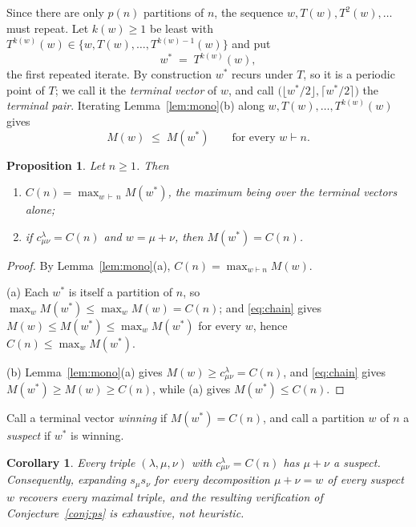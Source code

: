 \documentclass[11pt]{article}
\newtheorem{proposition}[theorem]{Proposition}
\newtheorem{corollary}[theorem]{Corollary}
\theoremstyle{remark}
\newcommand{\lam}{\lambda}
\begin{document}
Since there are only $p(n)$ partitions of $n$, the sequence $w,T(w),T^2(w),\dots$ must
repeat. Let $k(w)\ge 1$ be least with $T^{k(w)}(w)\in\{w,T(w),\dots,T^{k(w)-1}(w)\}$ and
put
\[
w^\ast\;=\;T^{k(w)}(w),
\]
the first repeated iterate. By construction $w^\ast$ recurs under $T$, so it is a
periodic point of $T$; we call it the \emph{terminal vector} of $w$, and call
$\bigl(\lfloor w^\ast/2\rfloor,\lceil w^\ast/2\rceil\bigr)$ the \emph{terminal pair}.
Iterating Lemma~\ref{lem:mono}(b) along $w,T(w),\dots,T^{k(w)}(w)$ gives
\begin{equation}\label{eq:chain}
M(w)\;\le\;M(w^\ast)\qquad\text{for every }w\vdash n .
\end{equation}

\begin{proposition}\label{prop:complete}
Let $n\ge 1$. Then
\begin{enumerate}
\item[(a)] $\displaystyle C(n)=\max_{w\,\vdash\,n} M(w^\ast)$, the maximum being over the
terminal vectors alone;
\item[(b)] if $c^{\lam}_{\mu\nu}=C(n)$ and $w=\mu+\nu$, then $M(w^\ast)=C(n)$.
\end{enumerate}
\end{proposition}

\begin{proof}
By Lemma~\ref{lem:mono}(a), $C(n)=\max_{w\vdash n}M(w)$.

(a) Each $w^\ast$ is itself a partition of $n$, so $\max_w M(w^\ast)\le\max_w
M(w)=C(n)$; and \eqref{eq:chain} gives $M(w)\le M(w^\ast)\le \max_{w}M(w^\ast)$ for
every $w$, hence $C(n)\le\max_w M(w^\ast)$.

(b) Lemma~\ref{lem:mono}(a) gives $M(w)\ge c^{\lam}_{\mu\nu}=C(n)$, and \eqref{eq:chain}
gives $M(w^\ast)\ge M(w)\ge C(n)$, while (a) gives $M(w^\ast)\le C(n)$.
\end{proof}

Call a terminal vector \emph{winning} if $M(w^\ast)=C(n)$, and call a partition $w$ of
$n$ a \emph{suspect} if $w^\ast$ is winning.

\begin{corollary}\label{cor:exhaustive}
Every triple $(\lam,\mu,\nu)$ with $c^{\lam}_{\mu\nu}=C(n)$ has $\mu+\nu$ a suspect.
Consequently, expanding $s_\mu s_\nu$ for every decomposition $\mu+\nu=w$ of every
suspect $w$ recovers \emph{every} maximal triple, and the resulting verification of
Conjecture~\ref{conj:ps} is exhaustive, not heuristic.
\end{corollary}
\end{document}
